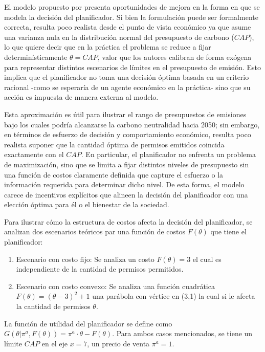 El modelo propuesto por  presenta oportunidades de mejora en la forma en que se modela la decisión del planificador. Si bien la formulación puede ser formalmente correcta, resulta poco realista desde el punto de vista económico ya que asume una varianza nula en la distribución normal del presupuesto de carbono ($CAP$), lo que quiere decir que en la práctica el problema se reduce a fijar determinísticamente $\theta = CAP$, valor que los autores calibran de forma exógena para representar distintos escenarios de límites en el presupuesto de emisión. Esto implica que el planificador no toma una decisión óptima basada en un criterio racional -como se esperaría de un agente económico en la práctica- sino que su acción es impuesta de manera externa al modelo.\medskip

Esta aproximación es útil para ilustrar el rango de presupuestos de emisiones bajo los cuales podría alcanzarse la carbono neutralidad hacia 2050; sin embargo, en términos de esfuerzo de decisión y comportamiento económico, resulta poco realista suponer que la cantidad óptima de permisos emitidos coincida exactamente con el $CAP$. En particular, el planificador no enfrenta un problema de maximización, sino que se limita a fijar distintos niveles de presupuesto sin una función de costos claramente definida que capture el esfuerzo o la información requerida para determinar dicho nivel. De esta forma, el modelo carece de incentivos explícitos que alineen la decisión del planificador con una elección óptima para él o el bienestar de la sociedad.
\medskip

Para ilustrar cómo la estructura de costos afecta la decisión del planificador, se analizan dos escenarios teóricos par una función de costos $F(\theta)$ que tiene el planificador: 
\begin{enumerate}
    \item Escenario con costo fijo: Se analiza un costo $F(\theta)=3$ el cual es independiente de la cantidad de permisos permitidos.
    \item Escenario con costo convexo: Se analiza una función cuadrática $F(\theta) = (\theta - 3)^2 + 1$ una parábola con vértice en (3,1) la cual si le afecta la cantidad de permisos $\theta$.
\end{enumerate}

La función de utilidad del planificador se define como $G(\theta|\pi^a,F(\theta))=\pi^a\cdot\theta-F(\theta)$. Para ambos casos mencionados, se tiene un límite $CAP$ en el eje $x=7$, un precio de venta $\pi^a=1$.

